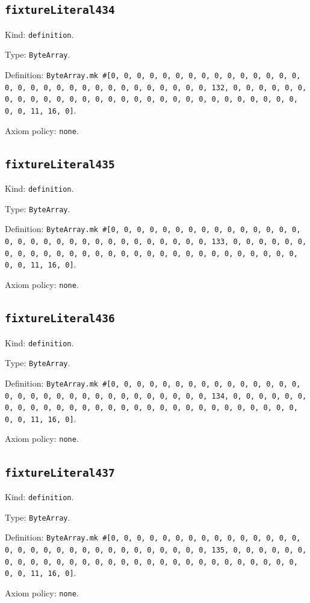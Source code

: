 \documentclass[11pt]{article}
\begin{document}
\subsection*{\texttt{fixtureLiteral434}}
\noindent Kind: \texttt{definition}.\par
\noindent Type: \texttt{ByteArray}.\par
\noindent Definition: \texttt{ByteArray.mk \#[0, 0, 0, 0, 0, 0, 0, 0, 0, 0, 0, 0, 0, 0, 0, 0, 0, 0, 0, 0, 0, 0, 0, 0, 0, 0, 0, 0, 0, 0, 0, 132, 0, 0, 0, 0, 0, 0, 0, 0, 0, 0, 0, 0, 0, 0, 0, 0, 0, 0, 0, 0, 0, 0, 0, 0, 0, 0, 0, 0, 0, 0, 0, 11, 16, 0]}.\par
\noindent Axiom policy: \texttt{none}.\par
\subsection*{\texttt{fixtureLiteral435}}
\noindent Kind: \texttt{definition}.\par
\noindent Type: \texttt{ByteArray}.\par
\noindent Definition: \texttt{ByteArray.mk \#[0, 0, 0, 0, 0, 0, 0, 0, 0, 0, 0, 0, 0, 0, 0, 0, 0, 0, 0, 0, 0, 0, 0, 0, 0, 0, 0, 0, 0, 0, 0, 133, 0, 0, 0, 0, 0, 0, 0, 0, 0, 0, 0, 0, 0, 0, 0, 0, 0, 0, 0, 0, 0, 0, 0, 0, 0, 0, 0, 0, 0, 0, 0, 11, 16, 0]}.\par
\noindent Axiom policy: \texttt{none}.\par
\subsection*{\texttt{fixtureLiteral436}}
\noindent Kind: \texttt{definition}.\par
\noindent Type: \texttt{ByteArray}.\par
\noindent Definition: \texttt{ByteArray.mk \#[0, 0, 0, 0, 0, 0, 0, 0, 0, 0, 0, 0, 0, 0, 0, 0, 0, 0, 0, 0, 0, 0, 0, 0, 0, 0, 0, 0, 0, 0, 0, 134, 0, 0, 0, 0, 0, 0, 0, 0, 0, 0, 0, 0, 0, 0, 0, 0, 0, 0, 0, 0, 0, 0, 0, 0, 0, 0, 0, 0, 0, 0, 0, 11, 16, 0]}.\par
\noindent Axiom policy: \texttt{none}.\par
\subsection*{\texttt{fixtureLiteral437}}
\noindent Kind: \texttt{definition}.\par
\noindent Type: \texttt{ByteArray}.\par
\noindent Definition: \texttt{ByteArray.mk \#[0, 0, 0, 0, 0, 0, 0, 0, 0, 0, 0, 0, 0, 0, 0, 0, 0, 0, 0, 0, 0, 0, 0, 0, 0, 0, 0, 0, 0, 0, 0, 135, 0, 0, 0, 0, 0, 0, 0, 0, 0, 0, 0, 0, 0, 0, 0, 0, 0, 0, 0, 0, 0, 0, 0, 0, 0, 0, 0, 0, 0, 0, 0, 11, 16, 0]}.\par
\noindent Axiom policy: \texttt{none}.\par
\end{document}
